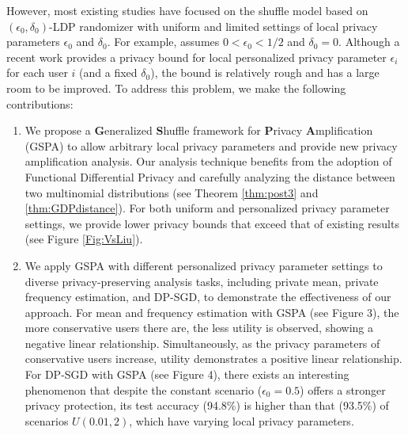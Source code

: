 \documentclass[letterpaper]{article} %
\begin{document}
However, most existing studies have focused on the shuffle model based on $(\epsilon_0,\delta_0)$-LDP randomizer with uniform and limited settings of local privacy parameters $\epsilon_0$ and $\delta_0$.
For example,  \citealt{Erlingsson2019amplification} assumes $0<\epsilon_0<1/2$ and $\delta_0 = 0$.
Although a recent work \citealt{Liu2023} provides a privacy bound for local personalized privacy parameter $\epsilon_i$  for each user $i$ (and a fixed $\delta_0$), the bound is relatively rough and has a large room to be improved.
To address this problem, we make the following contributions:
\begin{enumerate}
  \item We propose a {\bf G}eneralized {\bf S}huffle framework for {\bf P}rivacy {\bf A}mplification (GSPA) to allow arbitrary local privacy parameters and provide new privacy amplification analysis.
Our analysis technique benefits from the adoption of Functional Differential Privacy \cite{Dong2022gaussian} and carefully analyzing the distance between two multinomial distributions (see Theorem \ref{thm:post3} and \ref{thm:GDPdistance}).
For both uniform and personalized privacy parameter settings, we provide lower privacy bounds that exceed that of existing results (see Figure \ref{Fig:VsLiu}).

\item We apply GSPA with different personalized privacy parameter settings to diverse privacy-preserving analysis tasks, including private mean, private frequency estimation, and DP-SGD, to demonstrate the effectiveness of our approach.
For mean and frequency estimation with GSPA (see Figure 3), the more conservative users there are, the less utility is observed, showing a negative linear relationship. Simultaneously, as the privacy parameters of conservative users increase, utility demonstrates a positive linear relationship.
For DP-SGD with GSPA (see Figure 4), there exists an interesting phenomenon that despite the constant scenario ($\epsilon_0=0.5$) offers a stronger privacy protection, its test accuracy (94.8\%) is higher than that (93.5\%) of scenarios $U(0.01,2)$, which have varying local privacy parameters.
\end{enumerate}
\end{document}
